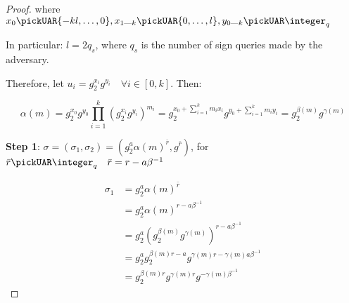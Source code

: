 \begin{proof}
    where $x_0 \pickUAR \{-kl, \dots, 0\}, x_{1\upto k} \pickUAR \{0, \dots, l\}, y_{0\upto k} \pickUAR \integer_q$

    In particular: $l = 2q_s$, where $q_s$ is the number of sign queries made by the adversary.

    Therefore, let $u_i = g_2^{x_i}g^{y_i} \quad \forall i \in [0, k]$. Then:

    \begin{equation*}
        \alpha(m) = g_2^{x_0}g^{y_0} \prod_{i=1}^k (g_2^{x_i}g^{y_i})^{m_i} = g_2^{x_0+\sum_{i=1}^k m_ix_i}g^{y_0+\sum_{i=1}^k m_iy_i} = g_2^{\beta(m)}g^{\gamma(m)}
    \end{equation*}


    \textbf{Step 1}: $\sigma = (\sigma_1, \sigma_2) = (g_2^a \alpha(m)^{\bar{r}}, g^{\bar{r}})$, for $\bar{r} \pickUAR \integer_q \quad \bar{r} = r - a\beta^{-1}$

    \begin{align*}
        \sigma_1 &= g_2^a\alpha(m)^{\bar{r}} \\
        &= g_2^a\alpha(m)^{r - a\beta^{-1}} \\
        &= g_2^a (g_2^{\beta(m)} g^{\gamma(m)})^{r - a\beta^{-1}} \\
        &= g_2^a g_2^{\beta(m)r-a} g^{\gamma(m)r - \gamma(m)a\beta^{-1}} \\
        &= g_2^{\beta(m)r} g^{\gamma(m)r} g^{-\gamma(m)\beta^{-1}}
    \end{align*}

\end{proof}

